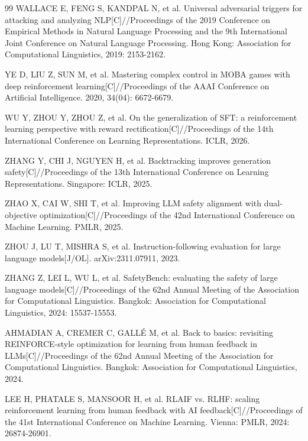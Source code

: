 \documentclass[fontset=fandol,type=master,campus=shenzhen,etitleauto=true]{hithesisbook}
\begin{document}
\begin{thebibliography}{99}
 WALLACE E, FENG S, KANDPAL N, et al. Universal adversarial triggers for attacking and analyzing NLP[C]//Proceedings of the 2019 Conference on Empirical Methods in Natural Language Processing and the 9th International Joint Conference on Natural Language Processing. Hong Kong: Association for Computational Linguistics, 2019: 2153-2162.

 YE D, LIU Z, SUN M, et al. Mastering complex control in MOBA games with deep reinforcement learning[C]//Proceedings of the AAAI Conference on Artificial Intelligence. 2020, 34(04): 6672-6679.

 WU Y, ZHOU Y, ZHOU Z, et al. On the generalization of SFT: a reinforcement learning perspective with reward rectification[C]//Proceedings of the 14th International Conference on Learning Representations. ICLR, 2026.

 ZHANG Y, CHI J, NGUYEN H, et al. Backtracking improves generation safety[C]//Proceedings of the 13th International Conference on Learning Representations. Singapore: ICLR, 2025.

 ZHAO X, CAI W, SHI T, et al. Improving LLM safety alignment with dual-objective optimization[C]//Proceedings of the 42nd International Conference on Machine Learning. PMLR, 2025.

 ZHOU J, LU T, MISHRA S, et al. Instruction-following evaluation for large language models[J/OL]. arXiv:2311.07911, 2023.

 ZHANG Z, LEI L, WU L, et al. SafetyBench: evaluating the safety of large language models[C]//Proceedings of the 62nd Annual Meeting of the Association for Computational Linguistics. Bangkok: Association for Computational Linguistics, 2024: 15537-15553.

 AHMADIAN A, CREMER C, GALL\'E M, et al. Back to basics: revisiting REINFORCE-style optimization for learning from human feedback in LLMs[C]//Proceedings of the 62nd Annual Meeting of the Association for Computational Linguistics. Bangkok: Association for Computational Linguistics, 2024.

 LEE H, PHATALE S, MANSOOR H, et al. RLAIF vs. RLHF: scaling reinforcement learning from human feedback with AI feedback[C]//Proceedings of the 41st International Conference on Machine Learning. Vienna: PMLR, 2024: 26874-26901.

\end{thebibliography}
\end{document}
